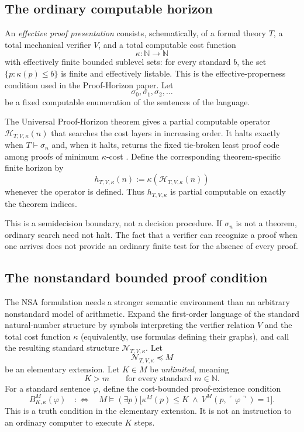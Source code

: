 \documentclass[11pt]{article}
\theoremstyle{definition}
\theoremstyle{remark}
\newcommand{\N}{\mathbb N}
\begin{document}
\subsection{The ordinary computable horizon}
An \emph{effective proof presentation} consists, schematically, of a formal theory $T$, a total mechanical verifier $V$, and a total computable cost function
\[
\kappa:\N\to\N
\]
with effectively finite bounded sublevel sets: for every standard $b$, the set $\{p:\kappa(p)\le b\}$ is finite and effectively listable. This is the effective-properness condition used in the Proof-Horizon paper. Let
\[
\sigma_0,\sigma_1,\sigma_2,\ldots
\]
be a fixed computable enumeration of the sentences of the language.

The Universal Proof-Horizon theorem gives a partial computable operator $\mathcal H_{T,V,\kappa}(n)$ that searches the cost layers in increasing order. It halts exactly when $T\vdash\sigma_n$ and, when it halts, returns the fixed tie-broken least proof code among proofs of minimum $\kappa$-cost \cite{ProofHorizon}. Define the corresponding theorem-specific finite horizon by
\[
h_{T,V,\kappa}(n)
:=
\kappa\!\left(\mathcal H_{T,V,\kappa}(n)\right)
\]
whenever the operator is defined. Thus $h_{T,V,\kappa}$ is partial computable on exactly the theorem indices.

This is a semidecision boundary, not a decision procedure. If $\sigma_n$ is not a theorem, ordinary search need not halt. The fact that a verifier can recognize a proof when one arrives does not provide an ordinary finite test for the absence of every proof.

\subsection{The nonstandard bounded proof condition}
The NSA formulation needs a stronger semantic environment than an arbitrary nonstandard model of arithmetic. Expand the first-order language of the standard natural-number structure by symbols interpreting the verifier relation $V$ and the total cost function $\kappa$ (equivalently, use formulas defining their graphs), and call the resulting standard structure $\mathcal N_{T,V,\kappa}$. Let
\[
\mathcal N_{T,V,\kappa}\preccurlyeq M
\]
be an elementary extension. Let $K\in M$ be \emph{unlimited}, meaning
\[
K>m
\qquad\text{for every standard }m\in\N.
\]
For a standard sentence $\varphi$, define the cost-bounded proof-existence condition
\begin{equation}
B^{M}_{K,\kappa}(\varphi)
\quad:\Longleftrightarrow\quad
M\models
(\exists p)\bigl[\kappa^M(p)\le K\ \wedge\ V^M(p,\ulcorner\varphi\urcorner)=1\bigr].
\label{eq:generalB}
\end{equation}
This is a truth condition in the elementary extension. It is not an instruction to an ordinary computer to execute $K$ steps.
\end{document}
